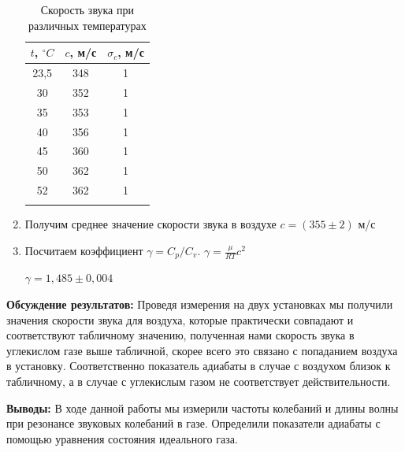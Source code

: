 \documentclass[a4paper, 12pt]{article}%
\begin{document}
\begin{enumerate}
\begin{longtable}{|c|c|c|}
	\hline
	$ t $, $^{\circ}C$  & $ c $, м/с & $ \sigma_c $, м/с  \\ \hline
	23,5 & 348 & 1 \\ \hline
	30 & 352 & 1  \\ \hline
	35 & 353 & 1 \\ \hline
	40 & 356 & 1  \\ \hline
	45 & 360 & 1 \\ \hline
	50 & 362 & 1  \\ \hline
	52 & 362 & 1  \\ \hline
	\caption{Скорость звука при различных температурах}
\end{longtable}
 \item Получим среднее значение скорости звука в воздухе $c = (355 \pm 2)$ м/с
\item Посчитаем коэффициент $\gamma = C_p / C_v $. $\gamma = \frac{\mu}{RT}c^2 $ 

$\gamma = 1,485 \pm 0,004$
\end{enumerate}	


	\textbf{Обсуждение результатов:}
	Проведя измерения на двух установках мы получили значения скорости звука для воздуха, которые практически совпадают и соответствуют табличному значению, полученная нами скорость звука в углекислом газе выше табличной, скорее всего это связано с попаданием воздуха в установку. Соответственно показатель адиабаты в случае с воздухом близок к табличному, а в случае с углекислым газом не соответствует  действительности.
	
	
	\textbf{Выводы: }
	В ходе данной работы мы измерили частоты колебаний и длины волны при резонансе звуковых колебаний в газе. Определили показатели адиабаты с помощью уравнения состояния идеального газа.
	
	
	
	
	
	
	
\end{document}
